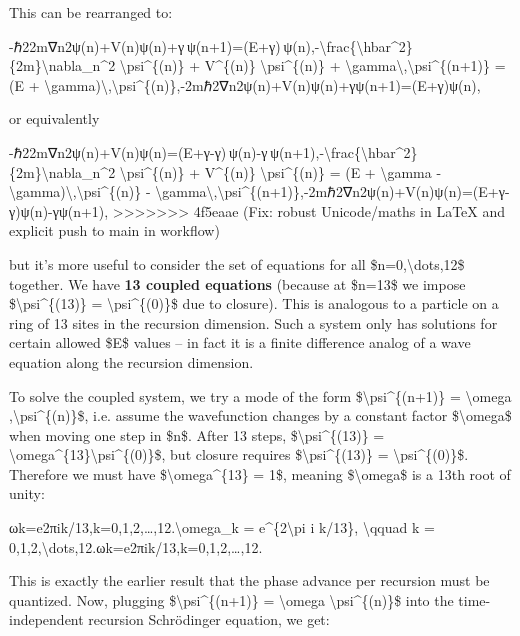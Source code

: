 \documentclass[]{article}
\begin{document}
This can be rearranged to:

-ℏ22m∇n2ψ(n)+V(n)ψ(n)+γ ψ(n+1)=(E+γ) ψ(n),-\textbackslash{}frac\{\textbackslash{}hbar\^{}2\}\{2m\}\textbackslash{}nabla\_n\^{}2
\textbackslash{}psi\^{}\{(n)\} + V\^{}\{(n)\}
\textbackslash{}psi\^{}\{(n)\} +
\textbackslash{}gamma\textbackslash{},\textbackslash{}psi\^{}\{(n+1)\} =
(E +
\textbackslash{}gamma)\textbackslash{},\textbackslash{}psi\^{}\{(n)\},-2mℏ2​∇n2​ψ(n)+V(n)ψ(n)+γψ(n+1)=(E+γ)ψ(n),

or equivalently

-ℏ22m∇n2ψ(n)+V(n)ψ(n)=(E+γ-γ) ψ(n)-γ ψ(n+1),-\textbackslash{}frac\{\textbackslash{}hbar\^{}2\}\{2m\}\textbackslash{}nabla\_n\^{}2
\textbackslash{}psi\^{}\{(n)\} + V\^{}\{(n)\}
\textbackslash{}psi\^{}\{(n)\} = (E + \textbackslash{}gamma -
\textbackslash{}gamma)\textbackslash{},\textbackslash{}psi\^{}\{(n)\} -
\textbackslash{}gamma\textbackslash{},\textbackslash{}psi\^{}\{(n+1)\},-2mℏ2​∇n2​ψ(n)+V(n)ψ(n)=(E+γ-γ)ψ(n)-γψ(n+1),
>>>>>>> 4f5eaae (Fix: robust Unicode/maths in LaTeX and explicit push to main in workflow)

but it's more useful to consider the set of equations for all
\$n=0,\textbackslash{}dots,12\$ together. We have \textbf{13 coupled
equations} (because at \$n=13\$ we impose
\$\textbackslash{}psi\^{}\{(13)\} = \textbackslash{}psi\^{}\{(0)\}\$ due
to closure)​. This is analogous to a particle on a ring of 13 sites in
the recursion dimension. Such a system only has solutions for certain
allowed \$E\$ values -- in fact it is a finite difference analog of a
wave equation along the recursion dimension.

To solve the coupled system, we try a mode of the form
\$\textbackslash{}psi\^{}\{(n+1)\} = \textbackslash{}omega
,\textbackslash{}psi\^{}\{(n)\}\$, i.e. assume the wavefunction changes
by a constant factor \$\textbackslash{}omega\$ when moving one step in
\$n\$​. After 13 steps, \$\textbackslash{}psi\^{}\{(13)\} =
\textbackslash{}omega\^{}\{13\}\textbackslash{}psi\^{}\{(0)\}\$, but
closure requires \$\textbackslash{}psi\^{}\{(13)\} =
\textbackslash{}psi\^{}\{(0)\}\$. Therefore we must have
\$\textbackslash{}omega\^{}\{13\} = 1\$, meaning
\$\textbackslash{}omega\$ is a 13th root of unity:

ωk=e2πik/13,k=0,1,2,\ldots{},12.\textbackslash{}omega\_k =
e\^{}\{2\textbackslash{}pi i k/13\}, \textbackslash{}qquad k =
0,1,2,\textbackslash{}dots,12.ωk​=e2πik/13,k=0,1,2,\ldots{},12.​

This is exactly the earlier result that the phase advance per recursion
must be quantized. Now, plugging \$\textbackslash{}psi\^{}\{(n+1)\} =
\textbackslash{}omega \textbackslash{}psi\^{}\{(n)\}\$ into the
time-independent recursion Schrödinger equation, we get:
\end{document}
